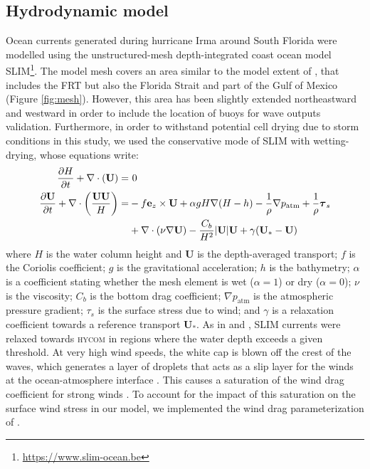 \documentclass[11pt,a4paper]{article}
\newcommand{\hycom}{\textsc{hycom} }
\newcommand{\UV}{\mathbf{U}}
\begin{document}
\subsection{Hydrodynamic model}
Ocean currents generated during hurricane Irma around South Florida were modelled using the unstructured-mesh depth-integrated coast ocean model SLIM\footnote{\url{https://www.slim-ocean.be}}. The model mesh covers an area similar to the model extent of \cite{dobbelaere2020coupled}, that includes the FRT but also the Florida Strait and part of the Gulf of Mexico (Figure \ref{fig:mesh}). However, this area has been slightly extended northeastward and westward in order to include the location of buoys for wave outputs validation. Furthermore, in order to withstand potential cell drying due to storm conditions in this study, we used the conservative mode of SLIM with wetting-drying, whose equations write:
\begin{equation}
    \begin{split}
        \dfrac{\partial H}{\partial t} +\nabla\cdot(\UV) =& ~0 \\
        \dfrac{\partial \UV}{\partial t}  + \nabla\cdot\left(\dfrac{\UV\UV}{H}\right) =& -f\mathbf{e}_z \times \UV + \alpha gH\nabla(H-h) - \dfrac{1}{\rho}\nabla p_\text{atm} + \dfrac{1}{\rho}\text{\boldmath$\tau$}_s \\
         &+\nabla\cdot(\nu\nabla\UV) - \dfrac{C_b}{H^2}|\UV|\UV + \gamma(\UV_\ast-\UV)
    \end{split} \label{eq:slim}
\end{equation}
where $H$ is the water column height and $\UV$ is the depth-averaged transport; $f$ is the Coriolis coefficient; $g$ is the gravitational acceleration; $h$ is the bathymetry; $\alpha$ is a coefficient stating whether the mesh element is wet ($\alpha=1$) or dry ($\alpha=0$); $\nu$  is the viscosity; $C_b$ is the bottom drag coefficient; $\nabla p_\text{atm}$ is the atmospheric pressure gradient; {\boldmath$\tau$}$_s$ is the surface stress due to wind; and $\gamma$ is a relaxation coefficient towards a reference transport $\UV_\ast$. As in \cite{frys2020fine} and \cite{dobbelaere2020coupled}, SLIM currents were relaxed towards \hycom \citep{chassignet2007hycom} in regions where the water depth exceeds a given threshold. At very high wind speeds, the white cap is blown off the crest of the waves, which generates a layer of droplets that acts as a slip layer for the winds at the ocean-atmosphere interface \citep{holthuijsen2012wind}. This causes a saturation of the wind drag coefficient for strong winds \citep{donelan2004limiting,powell2003reduced}. To account for the impact of this saturation on the surface wind stress in our model, we implemented the wind drag parameterization of \cite{moon2007physics}.
\end{document}
